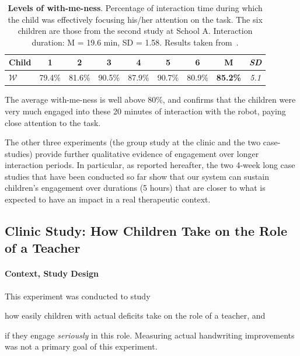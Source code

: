\documentclass{article}
\begin{document}
\begin{table}[h!]
    \centering
    \caption{\textbf{Levels of with-me-ness}. Percentage of interaction time
        during which the child was effectively focusing his/her attention on the
        task. The six children are those from the second study at School A.
        Interaction duration: M = 19.6 min, SD = 1.58. Results
        taken from~\cite{lemaignan2016realtime}.}

    \begin{tabular}{p{1cm}cccccccc}
        \toprule
        \bf Child & 1 & 2 & 3 & 4 & 5 & 6 & {\bf M} & {\it SD} \\
        \midrule
        $\mathcal{W}$ & 79.4\% & 81.6\%  & 90.5\% & 87.9\% & 90.7\% & 80.9\% & {\bf 85.2\%} & {\it 5.1} \\ 
        \bottomrule
    \end{tabular}
    \label{tab:results-with-me-ness}
\end{table}

The average with-me-ness is well above 80\%, and confirms that the children
were very much engaged into these 20 minutes of interaction with the robot,
paying close attention to the task.

The other three experiments (the group study at the clinic and the two
case-studies) provide further qualitative evidence of engagement over longer
interaction periods. In particular, as reported hereafter, the two 4-week long
case studies that have been conducted so far show that our system can sustain
children's engagement over durations (5 hours) that are closer to what is
expected to have an impact in a real therapeutic context.

\subsection{Clinic Study: How Children Take on the Role of a Teacher}\label{normandie}
\label{study_normandy}

\paragraph{Context, Study Design}

\begin{inparaenum}[\itshape 1\upshape)]
This experiment was conducted to study \item how easily children with actual
deficits take on the role of a teacher, and \item if they engage
\emph{seriously} in this role. Measuring actual handwriting improvements was
not a primary goal of this experiment.
\end{inparaenum}
\end{document}
